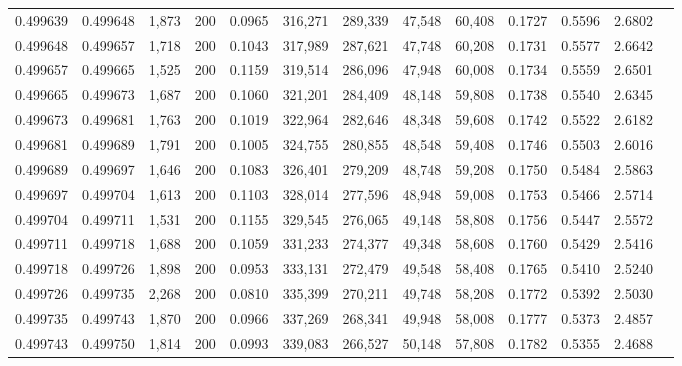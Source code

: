\begin{tabular}{rrrrrrrrrrrrr}
0.499639 & 0.499648 & 1,873 & 200 &                                     0.0965 & 316,271 & 289,339 &  47,548 &  60,408 & 0.1727 & 0.5596 & 2.6802 \\
0.499648 & 0.499657 & 1,718 & 200 &                                     0.1043 & 317,989 & 287,621 &  47,748 &  60,208 & 0.1731 & 0.5577 & 2.6642 \\
0.499657 & 0.499665 & 1,525 & 200 &                                     0.1159 & 319,514 & 286,096 &  47,948 &  60,008 & 0.1734 & 0.5559 & 2.6501 \\
0.499665 & 0.499673 & 1,687 & 200 &                                     0.1060 & 321,201 & 284,409 &  48,148 &  59,808 & 0.1738 & 0.5540 & 2.6345 \\
0.499673 & 0.499681 & 1,763 & 200 &                                     0.1019 & 322,964 & 282,646 &  48,348 &  59,608 & 0.1742 & 0.5522 & 2.6182 \\
0.499681 & 0.499689 & 1,791 & 200 &                                     0.1005 & 324,755 & 280,855 &  48,548 &  59,408 & 0.1746 & 0.5503 & 2.6016 \\
0.499689 & 0.499697 & 1,646 & 200 &                                     0.1083 & 326,401 & 279,209 &  48,748 &  59,208 & 0.1750 & 0.5484 & 2.5863 \\
0.499697 & 0.499704 & 1,613 & 200 &                                     0.1103 & 328,014 & 277,596 &  48,948 &  59,008 & 0.1753 & 0.5466 & 2.5714 \\
0.499704 & 0.499711 & 1,531 & 200 &                                     0.1155 & 329,545 & 276,065 &  49,148 &  58,808 & 0.1756 & 0.5447 & 2.5572 \\
0.499711 & 0.499718 & 1,688 & 200 &                                     0.1059 & 331,233 & 274,377 &  49,348 &  58,608 & 0.1760 & 0.5429 & 2.5416 \\
0.499718 & 0.499726 & 1,898 & 200 &                                     0.0953 & 333,131 & 272,479 &  49,548 &  58,408 & 0.1765 & 0.5410 & 2.5240 \\
0.499726 & 0.499735 & 2,268 & 200 &                                     0.0810 & 335,399 & 270,211 &  49,748 &  58,208 & 0.1772 & 0.5392 & 2.5030 \\
0.499735 & 0.499743 & 1,870 & 200 &                                     0.0966 & 337,269 & 268,341 &  49,948 &  58,008 & 0.1777 & 0.5373 & 2.4857 \\
0.499743 & 0.499750 & 1,814 & 200 &                                     0.0993 & 339,083 & 266,527 &  50,148 &  57,808 & 0.1782 & 0.5355 & 2.4688 \\

\end{tabular}
